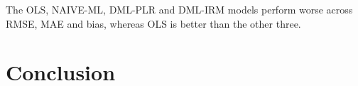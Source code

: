 \documentclass[10pt]{article}
\begin{document}
The OLS, NAIVE-ML, DML-PLR and DML-IRM models perform worse across RMSE, MAE and bias, whereas OLS is better than the other three.

\section{Conclusion}


	
\end{document}
